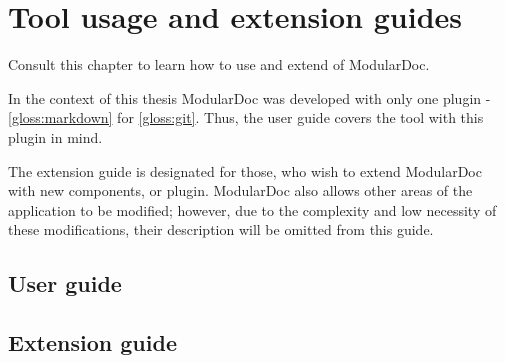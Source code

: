 \chapter{Tool usage and extension guides}

Consult this chapter to learn how to use and extend of ModularDoc.

In the context of this thesis ModularDoc was developed with only one plugin - \ref{gloss:markdown} for \ref{gloss:git}.
Thus, the user guide covers the tool with this plugin in mind.

The extension guide is designated for those, who wish to extend ModularDoc with new components, or plugin. ModularDoc also allows other areas of the application to be modified; however, due to the complexity and low necessity of these modifications, their description will be omitted from this guide.

\section{User guide}



\section{Extension guide}


